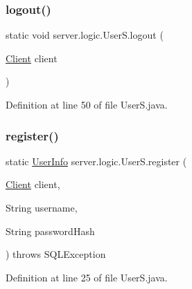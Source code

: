 \hypertarget{classserver_1_1logic_1_1_user_s_a8048a38381a80d7a1fd9577bf5aa74be}{}\label{classserver_1_1logic_1_1_user_s_a8048a38381a80d7a1fd9577bf5aa74be} 
\subsubsection{\texorpdfstring{logout()}{logout()}}
{\footnotesize\ttfamily static void server.\+logic.\+User\+S.\+logout (\begin{DoxyParamCaption}\item[{\hyperlink{classserver_1_1conn_1_1_client}{Client}}]{client }\end{DoxyParamCaption})\hspace{0.3cm}{\ttfamily [static]}}



Definition at line 50 of file User\+S.\+java.

\hypertarget{classserver_1_1logic_1_1_user_s_a2ab851cb6f642119c3abbae9cb4d6e0a}{}\label{classserver_1_1logic_1_1_user_s_a2ab851cb6f642119c3abbae9cb4d6e0a} 
\subsubsection{\texorpdfstring{register()}{register()}}
{\footnotesize\ttfamily static \hyperlink{classsharedlib_1_1tuples_1_1_user_info}{User\+Info} server.\+logic.\+User\+S.\+register (\begin{DoxyParamCaption}\item[{\hyperlink{classserver_1_1conn_1_1_client}{Client}}]{client,  }\item[{String}]{username,  }\item[{String}]{password\+Hash }\end{DoxyParamCaption}) throws S\+Q\+L\+Exception\hspace{0.3cm}{\ttfamily [static]}}



Definition at line 25 of file User\+S.\+java.

\hypertarget{classserver_1_1logic_1_1_user_s_a82e1f4a79b818f0418c7b3626233b8cf}{}\label{classserver_1_1logic_1_1_user_s_a82e1f4a79b818f0418c7b3626233b8cf} 
